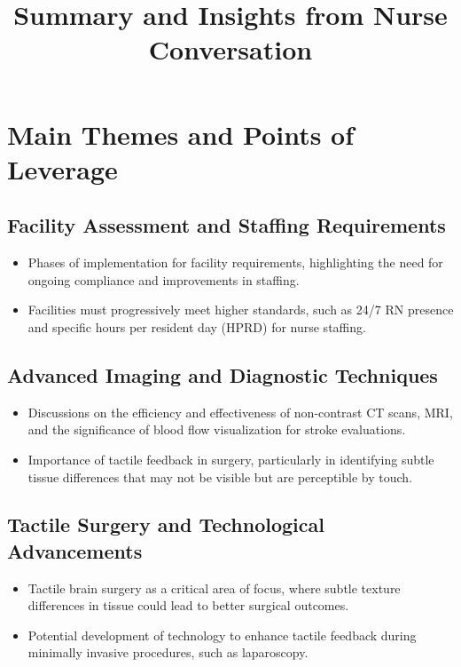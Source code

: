 \documentclass{article}
\title{Summary and Insights from Nurse Conversation}
\author{}
\date{}
\begin{document}
\maketitle

\section*{Main Themes and Points of Leverage}

\subsection*{Facility Assessment and Staffing Requirements}
\begin{itemize}
    \item Phases of implementation for facility requirements, highlighting the need for ongoing compliance and improvements in staffing.
    \item Facilities must progressively meet higher standards, such as 24/7 RN presence and specific hours per resident day (HPRD) for nurse staffing.
\end{itemize}

\subsection*{Advanced Imaging and Diagnostic Techniques}
\begin{itemize}
    \item Discussions on the efficiency and effectiveness of non-contrast CT scans, MRI, and the significance of blood flow visualization for stroke evaluations.
    \item Importance of tactile feedback in surgery, particularly in identifying subtle tissue differences that may not be visible but are perceptible by touch.
\end{itemize}

\subsection*{Tactile Surgery and Technological Advancements}
\begin{itemize}
    \item Tactile brain surgery as a critical area of focus, where subtle texture differences in tissue could lead to better surgical outcomes.
    \item Potential development of technology to enhance tactile feedback during minimally invasive procedures, such as laparoscopy.
\end{itemize}
\end{document}
